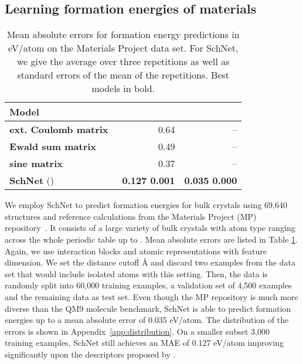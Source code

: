 \documentclass[aip,jcp,reprint,graphicx]{revtex4-1}
\newcommand{\new}[1]{#1}
\begin{document}
\subsection{Learning formation energies of materials}

\begin{table}
	\caption{\label{tab:mp} Mean absolute errors for formation energy predictions in eV/atom on the Materials Project data set. For SchNet, we give the average over three repetitions as well as standard errors \new{of the mean of the repetitions}. Best models in bold.}
	\begin{ruledtabular}
		\begin{tabular}{lrr}
			Model              &   &  \\ \hline
     		\textbf{ext. Coulomb matrix}~\citep{faber2015crystal} & 0.64 & -- \\
			\textbf{Ewald sum matrix}~\citep{faber2015crystal} & 0.49 & -- \\
			\textbf{sine matrix}~\citep{faber2015crystal} & 0.37 & -- \\
			\textbf{SchNet} ()   & \textbf{0.127  0.001} & \textbf{0.035  0.000}\\
		\end{tabular}
	\end{ruledtabular}
\end{table}

We employ SchNet to predict formation energies for bulk crystals using 69,640 structures and reference calculations from the Materials Project (MP) repository~\cite{Jain2013,Ong2012b}.
It consists of a large variety of bulk crystals with atom type ranging  across the whole periodic table up to .
Mean absolute errors are listed in Table \ref{tab:mp}.
Again, we use  interaction blocks and atomic representations with  feature dimension.
We set the distance cutoff {\AA} and discard two examples from the data set that would include isolated atoms with this setting.
Then, the data is randomly split into 60,000 training examples, a validation set of 4,500 examples and the remaining data as test set.
Even though the MP repository is much more diverse than the QM9 molecule benchmark, SchNet is able to predict formation energies up to a mean absolute error of 0.035 eV/atom.
\new{The distribution of the errors is shown in Appendix~\ref{app:distribution}.}
On a smaller subset 3,000 training examples, SchNet still achieves an MAE of 0.127 eV/atom improving significantly upon the descriptors proposed by \citet{faber2015crystal}.
\end{document}

